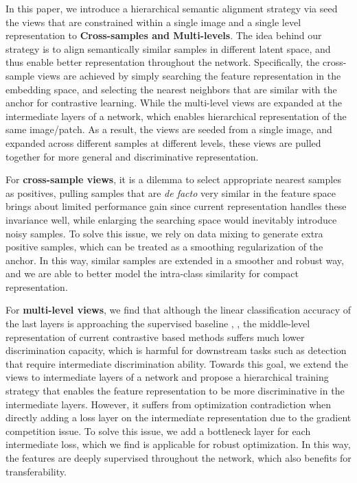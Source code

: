\documentclass[10pt,twocolumn,letterpaper]{article}
\begin{document}
In this paper, we introduce a hierarchical semantic alignment strategy via seed the views that are constrained within a single image and a single level representation to \textbf{Cross-samples and Multi-levels}. The idea behind our strategy is to align semantically similar samples in different latent space, and thus enable better representation throughout the network. Specifically, the cross-sample views are achieved by simply searching the feature representation in the embedding space, and selecting the nearest neighbors that are similar with the anchor for contrastive learning. While the multi-level views are expanded at the intermediate layers of a network, which enables hierarchical representation of the same image/patch. As a result, the views are seeded from a single image, and expanded across different samples at different levels, these views are pulled together for more general and discriminative representation.

For \textbf{cross-sample views}, it is a dilemma to select appropriate nearest samples as positives, pulling samples that are \emph{de facto} very similar in the feature space brings about limited performance gain since current representation handles these invariance well, while enlarging the searching space would inevitably introduce noisy samples. To solve this issue, we rely on data mixing to generate extra positive samples, which can be treated as a smoothing regularization of the anchor. In this way, similar samples are extended in a smoother and robust way, and we are able to better model the intra-class similarity for compact representation. 




For \textbf{multi-level views}, we find that although the linear classification accuracy of the last layers is approaching the supervised baseline \cite{chen2020simple}, \cite{chen2020big}, the middle-level representation of current contrastive based methods suffers much lower discrimination capacity, which is harmful for downstream tasks such as detection that require intermediate discrimination ability. Towards this goal, we extend the views to intermediate layers of a network and propose a hierarchical training strategy that enables the feature representation to be more discriminative in the intermediate layers. However, it suffers from optimization contradiction when directly adding a loss layer on the intermediate representation due to the gradient competition issue. To solve this issue, we add a bottleneck layer for each intermediate loss, which we find is applicable for robust optimization. In this way, the features are deeply supervised throughout the network, which also benefits for transferability.
\end{document}
